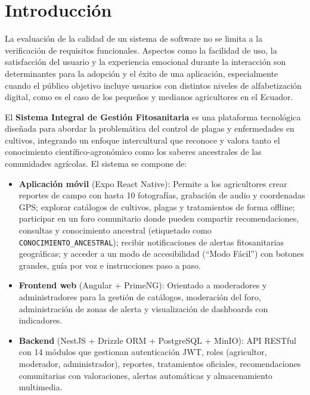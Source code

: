 \documentclass[a4paper,12pt]{report}
\begin{document}
\newpage

\tableofcontents
\newpage

\listoffigures
\newpage

\listoftables
\newpage



\chapter{Introducción}

La evaluación de la calidad de un sistema de software no se limita a la verificación de requisitos funcionales. Aspectos como la facilidad de uso, la satisfacción del usuario y la experiencia emocional durante la interacción son determinantes para la adopción y el éxito de una aplicación, especialmente cuando el público objetivo incluye usuarios con distintos niveles de alfabetización digital, como es el caso de los pequeños y medianos agricultores en el Ecuador.

El \textbf{Sistema Integral de Gestión Fitosanitaria} es una plataforma tecnológica diseñada para abordar la problemática del control de plagas y enfermedades en cultivos, integrando un enfoque intercultural que reconoce y valora tanto el conocimiento científico-agronómico como los saberes ancestrales de las comunidades agrícolas. El sistema se compone de:

\begin{itemize}
    \item \textbf{Aplicación móvil} (Expo React Native): Permite a los agricultores crear reportes de campo con hasta 10 fotografías, grabación de audio y coordenadas GPS; explorar catálogos de cultivos, plagas y tratamientos de forma offline; participar en un foro comunitario donde pueden compartir recomendaciones, consultas y conocimiento ancestral (etiquetado como \texttt{CONOCIMIENTO\_ANCESTRAL}); recibir notificaciones de alertas fitosanitarias geográficas; y acceder a un modo de accesibilidad (``Modo Fácil'') con botones grandes, guía por voz e instrucciones paso a paso.
    \item \textbf{Frontend web} (Angular + PrimeNG): Orientado a moderadores y administradores para la gestión de catálogos, moderación del foro, administración de zonas de alerta y visualización de dashboards con indicadores.
    \item \textbf{Backend} (NestJS + Drizzle ORM + PostgreSQL + MinIO): API RESTful con 14 módulos que gestionan autenticación JWT, roles (agricultor, moderador, administrador), reportes, tratamientos oficiales, recomendaciones comunitarias con valoraciones, alertas automáticas y almacenamiento multimedia.
\end{itemize}
\end{document}
